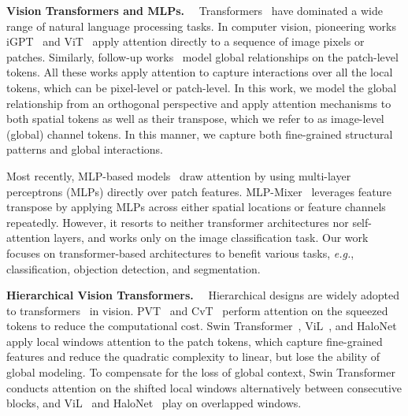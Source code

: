 \documentclass[runningheads]{llncs}
\newcommand{\eg}{\emph{e.g.}}
\begin{document}
\noindent \textbf{Vision Transformers and MLPs.}~~
Transformers~\cite{vaswani2017attention,devlin2019bert} have dominated a wide range of natural language processing tasks. 
In computer vision, pioneering works iGPT~\cite{chen2020generative} and ViT~\cite{dosovitskiy2020image} apply attention directly to a sequence of image pixels or patches.
Similarly, follow-up works~\cite{heo2021rethinking,touvron2021training,wang2021pyramid,srinivas2021bottleneck,wu2021rethinking,graham2021levit,XiaohuaZhai2021ScalingVT,riquelme2021scaling,MichaelSRyoo2021TokenLearnerWC} model global relationships on the patch-level tokens.
All these works apply attention to capture interactions over all the local tokens, which can be pixel-level or patch-level.
In this work, we model the global relationship from an orthogonal perspective and apply attention mechanisms to both spatial tokens as well as their transpose, which we refer to as image-level (global) channel tokens. In this manner, we capture both fine-grained structural patterns and global interactions.

Most recently, MLP-based models~\cite{mlp-mixer,resmlp,gmlp,yu2022s2,chen2021cyclemlp,lian2021mlp,hou2022vision} draw attention by using multi-layer perceptrons (MLPs) directly over patch features.
MLP-Mixer~\cite{mlp-mixer} leverages feature transpose by applying MLPs across either spatial locations or feature channels repeatedly. However, it resorts to neither transformer architectures nor self-attention layers, and works only on the image classification task. Our work focuses on transformer-based architectures to benefit various tasks, \eg, classification, objection detection, and segmentation.


\noindent \textbf{Hierarchical Vision Transformers.}~~
Hierarchical designs are widely adopted to transformers~\cite{liu2021swin,wang2021pyramid,wu2021cvt,ding2021hr,zhang2021multi,vaswani2021scaling,pan2021scalable,yuan2021volo,li2021localvit,ali2021xcit,li2022uniformer,zhou2021deepvit,tang2022quadtree,vaswani2021scaling,chen2021visformer,li2021bossnas,yu2021glance,huang2021shuffle,xu2021vitae,YanghaoLi2021ImprovedMV,JingkaiZhou2021ELSAEL} in vision.
PVT~\cite{wang2021pyramid} and CvT~\cite{wu2021cvt} perform attention on the squeezed tokens to reduce the computational cost.
Swin Transformer~\cite{liu2021swin}, ViL~\cite{zhang2021multi}, and HaloNet~\cite{vaswani2021scaling} apply local windows attention to the patch tokens, which capture fine-grained features and reduce the quadratic complexity to linear, but lose the ability of global modeling. To compensate for the loss of global context, Swin Transformer~\cite{liu2021swin} conducts attention on the shifted local windows alternatively between consecutive blocks, and ViL~\cite{zhang2021multi} and HaloNet~\cite{vaswani2021scaling} play on overlapped windows.
\end{document}
